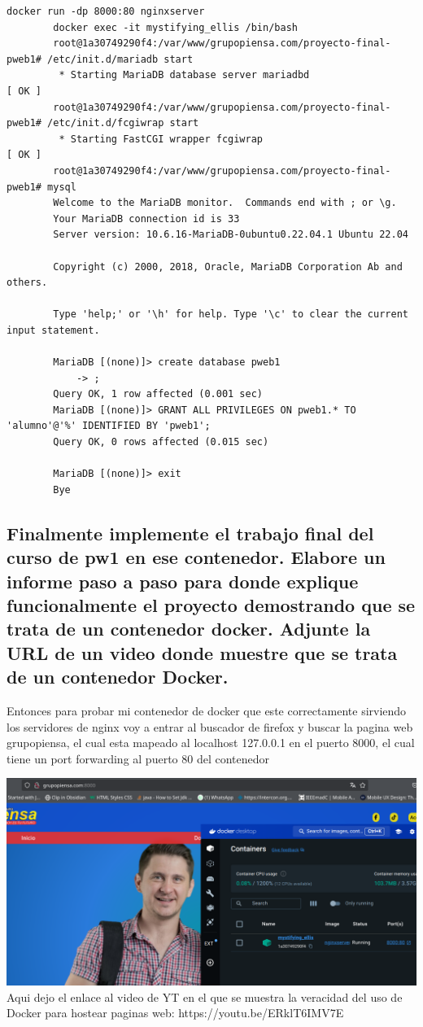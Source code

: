 	\begin{lstlisting}[style=mybash]
		docker run -dp 8000:80 nginxserver
		docker exec -it mystifying_ellis /bin/bash
		root@1a30749290f4:/var/www/grupopiensa.com/proyecto-final-pweb1# /etc/init.d/mariadb start
		 * Starting MariaDB database server mariadbd                                                                                                                                         [ OK ] 
		root@1a30749290f4:/var/www/grupopiensa.com/proyecto-final-pweb1# /etc/init.d/fcgiwrap start
		 * Starting FastCGI wrapper fcgiwrap                                                                                                                                                 [ OK ] 
		root@1a30749290f4:/var/www/grupopiensa.com/proyecto-final-pweb1# mysql
		Welcome to the MariaDB monitor.  Commands end with ; or \g.
		Your MariaDB connection id is 33
		Server version: 10.6.16-MariaDB-0ubuntu0.22.04.1 Ubuntu 22.04

		Copyright (c) 2000, 2018, Oracle, MariaDB Corporation Ab and others.

		Type 'help;' or '\h' for help. Type '\c' to clear the current input statement.

		MariaDB [(none)]> create database pweb1
		    -> ;
		Query OK, 1 row affected (0.001 sec)		
		MariaDB [(none)]> GRANT ALL PRIVILEGES ON pweb1.* TO 'alumno'@'%' IDENTIFIED BY 'pweb1';
		Query OK, 0 rows affected (0.015 sec)

		MariaDB [(none)]> exit
		Bye

	\end{lstlisting}

	\subsection{Finalmente implemente el trabajo final del curso de pw1 en ese contenedor. \newline
	Elabore un informe paso a paso para donde explique funcionalmente el proyecto demostrando  que se trata de un contenedor docker.\newline
	Adjunte la URL de un video donde muestre que se trata de un contenedor Docker. \newline}

	Entonces para probar mi contenedor de docker que este correctamente sirviendo los servidores de nginx voy a entrar al buscador de firefox 
	y buscar la pagina web grupopiensa, el cual esta mapeado al localhost 127.0.0.1 en el puerto 8000, el cual tiene un port forwarding
	al puerto 80 del contenedor

	\includegraphics[scale = 0.3]{./img/lab1_2.png}
	\newline
	Aqui dejo el enlace al video de YT en el que se muestra la veracidad del uso de Docker para hostear paginas web: https://youtu.be/ERklT6IMV7E

\pagebreak